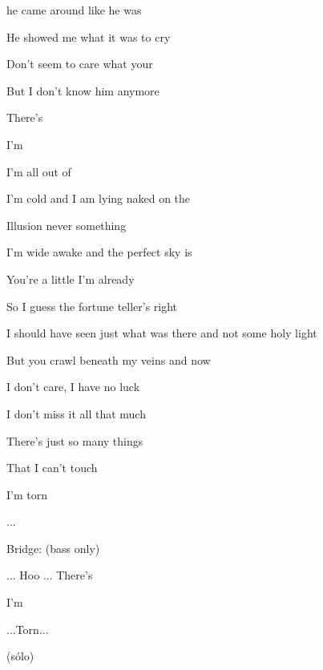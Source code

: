 
    

\zs
{}

 he came around like he was 

He showed me what it was to cry


 Don't seem to care what your 

But I don't know him anymore 

There's 




I'm 
\ks

\zr
I'm all out of  

I'm cold and I am  lying naked on the 

Illusion never  something 

I'm wide awake and  the perfect sky is 

You're a little  I'm already  
\kr

\zs
So I guess the fortune teller's right

I should have seen just what was there and not some holy light

But you crawl beneath my veins and now

I don't care, I have no luck

I don't miss it all that much 

There's just so many things

That I can't touch

I'm torn
\ks

\zr
\kr
...

Bridge: (bass only)

...  Hoo ...  
\zs
There's 




I'm 
\ks

\zr
\kr
...Torn...

\zr
(sólo)
\kr

\kp
